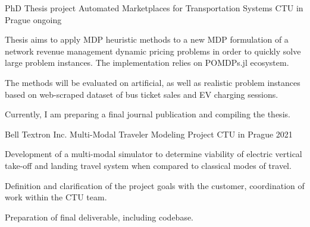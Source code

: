 

\begin{cventries}

  \cventry
    {PhD Thesis project} %
    {Automated Marketplaces for Transportation Systems} %
    {CTU in Prague} %
    {ongoing} %
    {
      \begin{cvitems} %
        \item {Thesis aims to apply MDP heuristic methods to a new MDP formulation of a network revenue management dynamic pricing problems in order to quickly solve large problem instances. The implementation relies on POMDPs.jl ecosystem.}
        \item {The methods will be evaluated on artificial, as well as realistic problem instances based on web-scraped dataset of bus ticket sales and EV charging sessions.}
        \item {Currently, I am preparing a final journal publication and compiling the thesis.}
      \end{cvitems}
    }

  \cventry
    {Bell Textron Inc. Multi-Modal Traveler Modeling Project} %
    {
    } %
    {CTU in Prague} %
    {2021} %
    {
      \begin{cvitems} %
        \item {Development of a multi-modal simulator to determine viability of electric vertical take-off and landing travel system when compared to classical modes of travel.}
        \item {Definition and clarification of the project goals with the customer, coordination of work within the CTU team.}
        \item {Preparation of final deliverable, including codebase. }
      \end{cvitems}
    }


\end{cventries}
